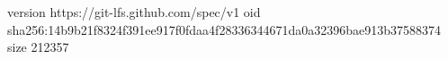 version https://git-lfs.github.com/spec/v1
oid sha256:14b9b21f8324f391ee917f0fdaa4f28336344671da0a32396bae913b37588374
size 212357

